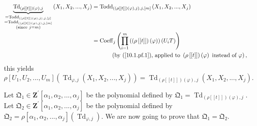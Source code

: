 \documentclass[numbers=enddot,12pt,final,onecolumn,notitlepage]{scrartcl}%
\begin{document}
\begin{align*}
\underbrace{\operatorname*{Td}\nolimits_{\left(  \rho\left[  \left[  t\right]
\right]  \right)  \left(  \varphi\right)  ,j}}%
_{\substack{=\operatorname*{Todd}\nolimits_{\left(  \left(  \rho\left[
\left[  t\right]  \right]  \right)  \left(  \varphi\right)  ,j\right)
,j,\left[  j\right]  }\\=\operatorname*{Todd}\nolimits_{\left(  \left(
\rho\left[  \left[  t\right]  \right]  \right)  \left(  \varphi\right)
,j\right)  ,j,\left[  m\right]  }\\\text{(since }j=m\text{)}}}\left(
X_{1},X_{2},...,X_{j}\right)   &  =\operatorname*{Todd}\nolimits_{\left(
\left(  \rho\left[  \left[  t\right]  \right]  \right)  \left(  \varphi
\right)  ,j\right)  ,j,\left[  m\right]  }\left(  X_{1},X_{2},...,X_{j}\right)
\\
&  =\operatorname*{Coeff}\nolimits_{j}\left(  \prod\limits_{i=1}^{m}\left(
\left(  \rho\left[  \left[  t\right]  \right]  \right)  \left(  \varphi
\right)  \right)  \left(  U_{i}T\right)  \right) \\
&  \ \ \ \ \ \ \ \ \ \ \left(  \text{by (\ref{10.1.pf.1}), applied to }\left(
\rho\left[  \left[  t\right]  \right]  \right)  \left(  \varphi\right)  \text{
instead of }\varphi\right)  ,
\end{align*}
this yields%
\begin{equation}
\rho\left[  U_{1},U_{2},...,U_{m}\right]  \left(  \operatorname*{Td}%
\nolimits_{\varphi,j}\left(  X_{1},X_{2},...,X_{j}\right)  \right)
=\operatorname*{Td}\nolimits_{\left(  \rho\left[  \left[  t\right]  \right]
\right)  \left(  \varphi\right)  ,j}\left(  X_{1},X_{2},...,X_{j}\right)  .
\label{10.21.pf.5}%
\end{equation}


Let $\mathfrak{Q}_{1}\in\mathbf{Z}^{\prime}\left[  \alpha_{1},\alpha
_{2},...,\alpha_{j}\right]  $ be the polynomial defined by $\mathfrak{Q}%
_{1}=\operatorname*{Td}\nolimits_{\left(  \rho\left[  \left[  t\right]
\right]  \right)  \left(  \varphi\right)  ,j}$. Let $\mathfrak{Q}_{2}%
\in\mathbf{Z}^{\prime}\left[  \alpha_{1},\alpha_{2},...,\alpha_{j}\right]  $
be the polynomial defined by $\mathfrak{Q}_{2}=\rho\left[  \alpha_{1}%
,\alpha_{2},...,\alpha_{j}\right]  \left(  \operatorname*{Td}%
\nolimits_{\varphi,j}\right)  $. We are now going to prove that $\mathfrak{Q}%
_{1}=\mathfrak{Q}_{2}$.
\end{document}
